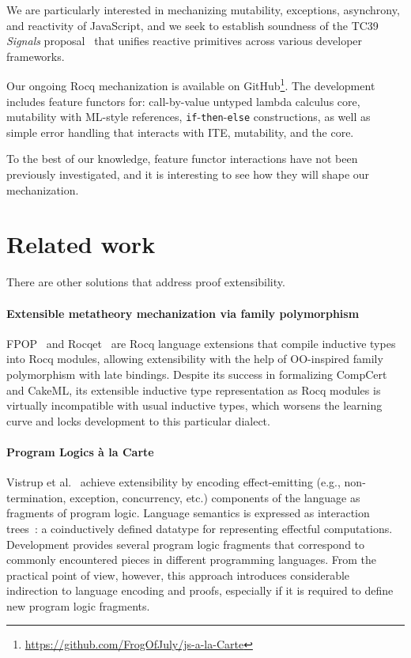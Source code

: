 \documentclass[sigplan,nonacm,review]{acmart}
\begin{document}
We are particularly interested in mechanizing
mutability, exceptions, asynchrony, and reactivity of JavaScript, and we seek to establish soundness of the TC39 \emph{Signals} proposal~\cite{signals-proposal-t39} that unifies reactive primitives across various developer frameworks. 



Our ongoing Rocq mechanization is available on
GitHub\footnote{\url{https://github.com/FrogOfJuly/js-a-la-Carte}}. 
The development includes feature functors for: call-by-value untyped lambda calculus core, mutability with ML-style references, \texttt{if}-\texttt{then}-\texttt{else} constructions, as well as simple error handling that interacts with ITE, mutability, and the core.

To the best of our knowledge, feature functor interactions have not been previously investigated, and it is interesting to see how they will shape our mechanization.

\section{Related work}

There are other solutions that address proof extensibility. 


\paragraph{Extensible metatheory mechanization via family polymorphism} FPOP~\cite{jin2023extensible} and Rocqet~\cite{ebresafe2025certified} are Rocq language extensions that compile inductive types into Rocq modules, allowing extensibility with the help of OO-inspired family polymorphism with late bindings. 
%
%
%
%
Despite its success in formalizing CompCert and CakeML, its extensible inductive type representation as Rocq modules is virtually incompatible with usual inductive types, which worsens the learning curve and locks development to this particular dialect. 

\paragraph{Program Logics à la Carte}
Vistrup et al.~\cite{vistrup2025program} achieve extensibility by encoding effect-emitting
(e.g., non-termination, exception, concurrency, etc.)
components of the language as fragments of program logic. 
Language semantics is expressed as interaction trees~\cite{xia2019interaction}: a coinductively defined datatype for representing effectful computations. 
Development provides several program logic fragments that correspond to commonly encountered pieces in different programming languages. 
%
%
%
%
From the practical point of view, however, this approach introduces considerable indirection to language encoding and proofs, especially if it is required to define new program logic fragments.
\end{document}
